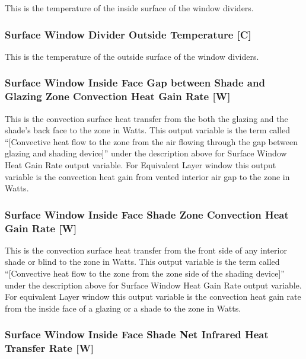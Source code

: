 This is the temperature of the inside surface of the window dividers.

\subsubsection{Surface Window Divider Outside Temperature {[}C{]}}\label{surface-window-divider-outside-temperature-c}

This is the temperature of the outside surface of the window dividers.

\subsubsection{Surface Window Inside Face Gap between Shade and Glazing Zone Convection Heat Gain Rate {[}W{]}}\label{surface-window-inside-face-gap-between-shade-and-glazing-zone-convection-heat-gain-rate-w}

This is the convection surface heat transfer from the both the glazing and the shade's back face to the zone in Watts. This output variable is the term called ``{[}Convective heat flow to the zone from the air flowing through the gap between glazing and shading device{]}'' under the description above for Surface Window Heat Gain Rate output variable. For Equivalent Layer window this output variable is the convection heat gain from vented interior air gap to the zone in Watts.

\subsubsection{Surface Window Inside Face Shade Zone Convection Heat Gain Rate {[}W{]}}\label{surface-window-inside-face-shade-zone-convection-heat-gain-rate-w}

This is the convection surface heat transfer from the front side of any interior shade or blind to the zone in Watts. This output variable is the term called ``{[}Convective heat flow to the zone from the zone side of the shading device{]}'' under the description above for Surface Window Heat Gain Rate output variable. For equivalent Layer window this output variable is the convection heat gain rate from the inside face of a glazing or a shade to the zone in Watts.

\subsubsection{Surface Window Inside Face Shade Net Infrared Heat Transfer Rate {[}W{]}}\label{surface-window-inside-face-shade-net-infrared-heat-transfer-rate-w}


